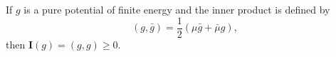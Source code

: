 If $g$ is a pure potential of finite energy and the inner product is defined by
$$(g, \bar{g}) = \frac{1}{2}(\mu \bar{g} + \bar{\mu} g),$$
then $\mathbf{I}(g) = (g, g) \geq 0$.
